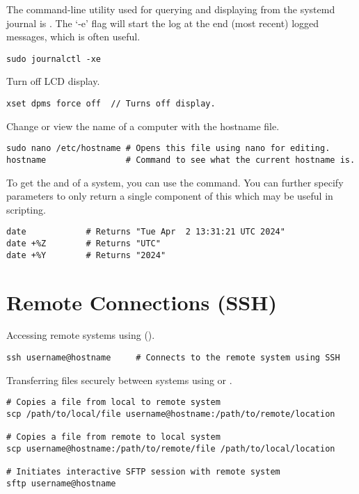 The command-line utility used for querying and displaying  from the systemd journal is . The `-e' flag will start the log at the end (most recent) logged messages, which is often useful.
\begin{lstlisting}
sudo journalctl -xe
\end{lstlisting}

Turn off LCD display.
\begin{lstlisting}
xset dpms force off  // Turns off display.
\end{lstlisting}

Change or view the  name of a computer with the hostname file.
\begin{lstlisting}
sudo nano /etc/hostname # Opens this file using nano for editing.
hostname                # Command to see what the current hostname is.
\end{lstlisting}

To get the  and  of a system, you can use the  command. You can further specify parameters to only return a single component of this which may be useful in scripting.
\begin{lstlisting}
date            # Returns "Tue Apr  2 13:31:21 UTC 2024"
date +%Z        # Returns "UTC"
date +%Y        # Returns "2024"
\end{lstlisting}





\section{Remote Connections (SSH)}


Accessing remote systems using  ().
\begin{lstlisting}
ssh username@hostname     # Connects to the remote system using SSH
\end{lstlisting}

Transferring files securely between systems using  or .
\begin{lstlisting}
# Copies a file from local to remote system
scp /path/to/local/file username@hostname:/path/to/remote/location

# Copies a file from remote to local system
scp username@hostname:/path/to/remote/file /path/to/local/location

# Initiates interactive SFTP session with remote system
sftp username@hostname    
\end{lstlisting}

